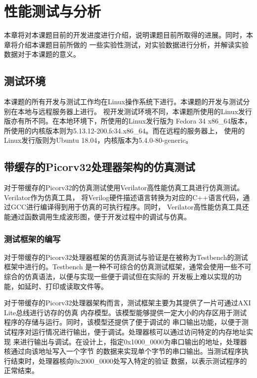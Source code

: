 \section{性能测试与分析}

本章将对本课题目前的开发进度进行介绍，说明课题目前所取得的进展。同时，本章将介绍本课题目前所做的
一些实验性测试，对实验数据进行分析，并解读实验数据对于本课题的意义。

\subsection{测试环境}

本课题的所有开发与测试工作均在Linux操作系统下进行。本课题的开发与测试分别在本地与远程服务器上进行。
视开发测试环境不同，本课题所使用的Linux发行版亦有所不同。在本地环境下，所使用的Linux发行版为
Fedora 34 x86\_64版本，所使用的内核版本则为5.13.12-200.fc34.x86\_64。而在远程的服务器上，
使用的Linux发行版则为Ubuntu 18.04，内核版本为5.4.0-80-generic。

\subsection{带缓存的Picorv32处理器架构的仿真测试}

对于带缓存的Picorv32的仿真测试使用Verilator高性能仿真工具进行仿真测试。Verilator作为仿真工具，
将Verilog硬件描述语言转换为对应的C++语言代码，通过GCC进行编译得到用于仿真的可执行程序。同时，
Verilator高性能仿真工具还能通过函数调用生成波形图，便于开发过程中的调试与仿真。

\subsubsection{测试框架的编写}

对于带缓存的Picorv32处理器框架的仿真测试与验证是在被称为Testbench的测试框架中进行的。Testbench
是一种不可综合的仿真测试框架，通常会使用一些不可综合的仿真语法，以便与实现一些便于调试但在实际的
开发板上难以实现的功能，如延时、打印或读取文件等。

对于带缓存的Picorv32处理器架构而言，测试框架主要为其提供了一片可通过AXI Lite总线进行访存的仿真
内存模型。该模型能够提供一定大小的内存区用于测试程序的存储与运行。同时，该模型还提供了便于调试的
串口输出功能，以便于测试程序对运行情况进行输出，便于调试。处理器核可以通过访问特定的内存地址实现
来进行输出与调试。在设计上，指定0x1000\_0000为串口输出的地址，处理器核通过向该地址写入一个字节
的数据来实现单个字节的串口输出。当测试程序执行结束时，处理器核向0x2000\_0000处写入特定的验证
数据，以表示测试程序的正常结束。

